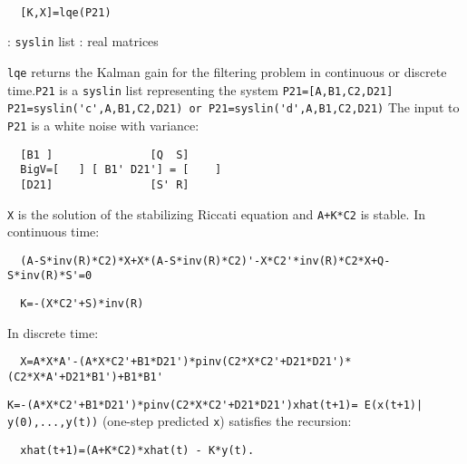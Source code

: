 \begin{mandesc}
   \\ %
\end{mandesc}
\begin{calling_sequence}
\begin{verbatim}
  [K,X]=lqe(P21)   
\end{verbatim}
\end{calling_sequence}
\begin{parameters}
  \begin{varlist}
    : \verb!syslin! list
    : real matrices
  \end{varlist}
\end{parameters}
\begin{mandescription}
  \verb!lqe! returns the Kalman gain for the filtering
  problem in continuous or discrete time.\verb!P21! is a \verb!syslin! list representing the system \verb!P21=[A,B1,C2,D21] P21=syslin('c',A,B1,C2,D21) or P21=syslin('d',A,B1,C2,D21)!
  The input to \verb!P21! is a white noise with variance:
\begin{verbatim}
  [B1 ]               [Q  S]
  BigV=[   ] [ B1' D21'] = [    ]
  [D21]               [S' R]
\end{verbatim}
  \verb!X! is the solution of the stabilizing Riccati 
  equation and \verb!A+K*C2! is stable.
  In continuous time:
\begin{verbatim}
  (A-S*inv(R)*C2)*X+X*(A-S*inv(R)*C2)'-X*C2'*inv(R)*C2*X+Q-S*inv(R)*S'=0
\end{verbatim}
\begin{verbatim}
  K=-(X*C2'+S)*inv(R)
\end{verbatim}
  In discrete time:
\begin{verbatim}
  X=A*X*A'-(A*X*C2'+B1*D21')*pinv(C2*X*C2'+D21*D21')*(C2*X*A'+D21*B1')+B1*B1'
\end{verbatim}
  \verb!K=-(A*X*C2'+B1*D21')*pinv(C2*X*C2'+D21*D21')!\verb!xhat(t+1)= E(x(t+1)| y(0),...,y(t))! (one-step predicted \verb!x!)
  satisfies the recursion:
\begin{verbatim}
  xhat(t+1)=(A+K*C2)*xhat(t) - K*y(t).
\end{verbatim}
\end{mandescription}
